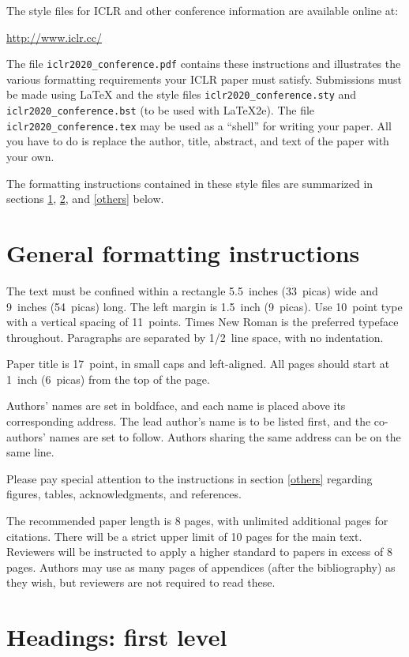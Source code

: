 \documentclass{article} %
\begin{document}
The style files for ICLR and other conference information are available online at:
\begin{center}
   \url{http://www.iclr.cc/}
\end{center}
The file \verb+iclr2020_conference.pdf+ contains these
instructions and illustrates the
various formatting requirements your ICLR paper must satisfy.
Submissions must be made using \LaTeX{} and the style files
\verb+iclr2020_conference.sty+ and \verb+iclr2020_conference.bst+ (to be used with \LaTeX{}2e). The file
\verb+iclr2020_conference.tex+ may be used as a ``shell'' for writing your paper. All you
have to do is replace the author, title, abstract, and text of the paper with
your own.

The formatting instructions contained in these style files are summarized in
sections \ref{gen_inst}, \ref{headings}, and \ref{others} below.

\section{General formatting instructions}
\label{gen_inst}

The text must be confined within a rectangle 5.5~inches (33~picas) wide and
9~inches (54~picas) long. The left margin is 1.5~inch (9~picas).
Use 10~point type with a vertical spacing of 11~points. Times New Roman is the
preferred typeface throughout. Paragraphs are separated by 1/2~line space,
with no indentation.

Paper title is 17~point, in small caps and left-aligned.
All pages should start at 1~inch (6~picas) from the top of the page.

Authors' names are
set in boldface, and each name is placed above its corresponding
address. The lead author's name is to be listed first, and
the co-authors' names are set to follow. Authors sharing the
same address can be on the same line.

Please pay special attention to the instructions in section \ref{others}
regarding figures, tables, acknowledgments, and references.

The recommended paper length is 8 pages, with unlimited additional pages for
citations.  There will be a strict upper limit of 10 pages for the main text.
Reviewers will be instructed to apply a higher standard to papers in excess of 8
pages.  Authors may use as many pages of appendices (after the bibliography) as
they wish, but reviewers are not required to read these.

\section{Headings: first level}
\label{headings}
\end{document}
